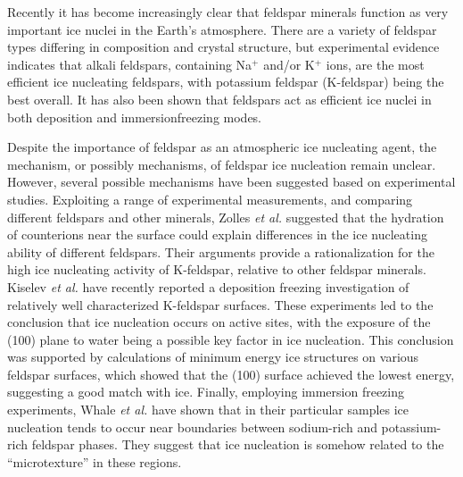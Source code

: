 \documentclass[preprint,aps,prb,floatfix]{revtex4-1}
\begin{document}
Recently it has become increasingly clear that feldspar minerals function as very important ice nuclei in the Earth's atmosphere.\cite{AMWW13,YLA13,VMWO17,AWKE14,ZWSH08,HWCH16,PKHE16,KMHP16,ZBHB15,WHKK17,HWTO19,KBPC17} There are a variety of feldspar types differing in composition and crystal structure, but experimental evidence\cite{HWCH16,PKHE16,KMHP16,ZBHB15,WHKK17} indicates that alkali feldspars, containing Na$^{+}$ and/or K$^{+}$ ions, are the most efficient ice nucleating feldspars, with potassium feldspar (K-feldspar) being the best overall.\cite{HWCH16,KMHP16,ZBHB15} It has also been shown that feldspars act as efficient ice nuclei in both deposition\cite{YLA13,ZWSH08,KBPC17} and immersion\cite{AMWW13,AWKE14,HWCH16,PKHE16,KMHP16,ZBHB15,WHKK17,HWTO19}freezing modes. 

Despite the importance of feldspar as an atmospheric ice nucleating agent, the mechanism, or possibly mechanisms, of feldspar ice nucleation remain unclear. However, several possible mechanisms have been suggested based on experimental studies. Exploiting a range of experimental measurements, and comparing different feldspars and other minerals, Zolles {\it et al.}\cite{ZBHB15} suggested that the hydration of counterions near the surface could explain differences in the ice nucleating ability of different feldspars. Their arguments provide a rationalization for the high ice nucleating activity of K-feldspar, relative to other feldspar minerals. Kiselev {\it et al.}\cite{KBPC17} have recently reported a deposition freezing investigation of relatively well characterized K-feldspar surfaces. These experiments led to the conclusion that ice nucleation occurs on active sites, with the exposure of the (100) plane to water being a possible key factor in ice nucleation. This conclusion was supported by calculations of minimum energy ice structures on various feldspar surfaces, which showed that the (100) surface achieved the lowest energy, suggesting a good match with ice. Finally, employing immersion freezing experiments, Whale {\it et al.}\cite{WHKK17} have shown that in their particular samples ice nucleation tends to occur near boundaries between sodium-rich and potassium-rich feldspar phases. They suggest that ice nucleation is somehow related to the ``microtexture'' in these regions. 
\end{document}
